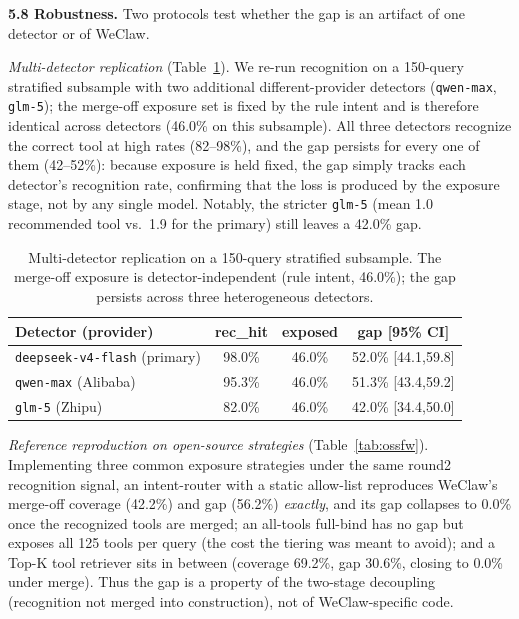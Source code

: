 \textbf{5.8 Robustness.} Two protocols test whether the gap is an artifact of one detector or of WeClaw.

\emph{Multi-detector replication} (Table~\ref{tab:multidet}). We re-run recognition on a 150-query stratified subsample with two additional different-provider detectors (\texttt{qwen-max}, \texttt{glm-5}); the merge-off exposure set is fixed by the rule intent and is therefore identical across detectors (46.0\% on this subsample). All three detectors recognize the correct tool at high rates (82--98\%), and the gap persists for every one of them (42--52\%): because exposure is held fixed, the gap simply tracks each detector's recognition rate, confirming that the loss is produced by the exposure stage, not by any single model. Notably, the stricter \texttt{glm-5} (mean 1.0 recommended tool vs.\ 1.9 for the primary) still leaves a 42.0\% gap.

\begin{table}[t]
\caption{Multi-detector replication on a 150-query stratified subsample. The merge-off exposure is detector-independent (rule intent, 46.0\%); the gap persists across three heterogeneous detectors.}
\label{tab:multidet}
\begin{center}
\footnotesize
\setlength{\tabcolsep}{3pt}
\begin{tabular}{lccc}
\toprule
\textbf{Detector (provider)} & \textbf{rec\_hit} & \textbf{exposed} & \textbf{gap} [95\% CI] \\
\midrule
\texttt{deepseek-v4-flash} (primary) & 98.0\% & 46.0\% & 52.0\% [44.1,59.8] \\
\texttt{qwen-max} (Alibaba) & 95.3\% & 46.0\% & 51.3\% [43.4,59.2] \\
\texttt{glm-5} (Zhipu) & 82.0\% & 46.0\% & 42.0\% [34.4,50.0] \\
\bottomrule
\end{tabular}
\end{center}
\end{table}

\emph{Reference reproduction on open-source strategies} (Table~\ref{tab:ossfw}). Implementing three common exposure strategies under the same round2 recognition signal, an intent-router with a static allow-list reproduces WeClaw's merge-off coverage (42.2\%) and gap (56.2\%) \emph{exactly}, and its gap collapses to 0.0\% once the recognized tools are merged; an all-tools full-bind has no gap but exposes all 125 tools per query (the cost the tiering was meant to avoid); and a Top-K tool retriever sits in between (coverage 69.2\%, gap 30.6\%, closing to 0.0\% under merge). Thus the gap is a property of the two-stage decoupling (recognition not merged into construction), not of WeClaw-specific code.


